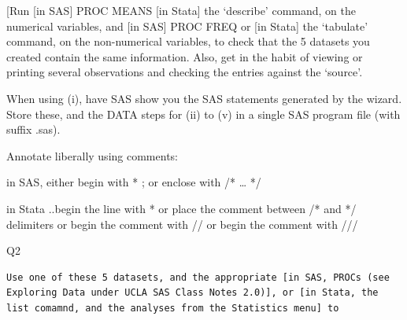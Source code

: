 \documentclass[]{book}
\begin{document}
{[}Run {[}in SAS{]} PROC MEANS {[}in Stata{]} the `describe' command, on the numerical variables, and {[}in SAS{]} PROC FREQ or {[}in Stata{]} the `tabulate' command, on the non-numerical variables, to check that the 5 datasets you created contain the same information. Also, get in the habit of viewing or printing several observations and checking the entries against the `source'.

When using (i), have SAS show you the SAS statements generated by the wizard. Store these, and the DATA steps for (ii) to (v) in a single SAS program file (with suffix .sas).

Annotate liberally using comments:

in SAS, either begin with * ; or enclose with /* \ldots{} */

in Stata ..begin the line with * or place the comment between /* and */ delimiters or begin the comment with // or begin the comment with ///

Q2

\begin{verbatim}
Use one of these 5 datasets, and the appropriate [in SAS, PROCs (see Exploring Data under UCLA SAS Class Notes 2.0)], or [in Stata, the list comamnd, and the analyses from the Statistics menu] to
\end{verbatim}
\end{document}
